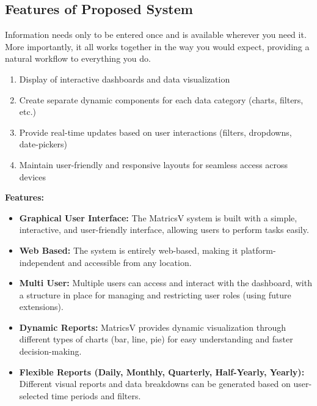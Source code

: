 \subsection{Features of Proposed System}


Information needs only to be entered once and is available wherever you need it. More importantly, it all works together in the way you would expect, providing a natural workflow to everything you do.

\begin{enumerate}
    \item {Display of interactive dashboards and data visualization}
    \item {Create separate dynamic components for each data category (charts, filters, etc.)}
    \item {Provide real-time updates based on user interactions (filters, dropdowns, date-pickers)}
    \item {Maintain user-friendly and responsive layouts for seamless access across devices}
\end{enumerate}



\textbf{Features:}


\begin{itemize}
    \item \textbf{Graphical User Interface:} The MatricsV system is built with a simple, interactive, and user-friendly interface, allowing users to perform tasks easily.
    
    \item \textbf{Web Based:} The system is entirely web-based, making it platform-independent and accessible from any location.
    
    \item \textbf{Multi User:} Multiple users can access and interact with the dashboard, with a structure in place for managing and restricting user roles (using future extensions).
    
    \item \textbf{Dynamic Reports:} MatricsV provides dynamic visualization through different types of charts (bar, line, pie) for easy understanding and faster decision-making.
    
    \item \textbf{Flexible Reports (Daily, Monthly, Quarterly, Half-Yearly, Yearly):} Different visual reports and data breakdowns can be generated based on user-selected time periods and filters.
\end{itemize}




